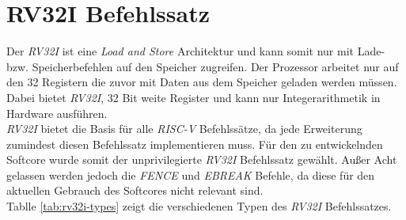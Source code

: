     \section{RV32I Befehlssatz}
        Der \textit{RV32I} ist eine \textit{Load and Store} Architektur und kann somit nur mit
        Lade- bzw. Speicherbefehlen auf den Speicher zugreifen.
        Der Prozessor arbeitet nur auf den 32 Registern die zuvor mit Daten aus dem Speicher geladen werden müssen.
        Dabei bietet \textit{RV32I}, 32 Bit weite Register und kann nur Integerarithmetik in Hardware ausführen.
        \\
        \textit{RV32I} bietet die Basis für alle \textit{RISC-V} Befehlssätze,
        da jede Erweiterung zumindest diesen Befehlssatz implementieren muss.
        Für den zu entwickelnden Softcore wurde somit der unprivilegierte \textit{RV32I} Befehlssatz gewählt.
        Außer Acht gelassen werden jedoch die \textit{FENCE} und \textit{EBREAK} Befehle, da diese für
        den aktuellen Gebrauch des Softcores nicht relevant sind.
        \\
        Tablle \ref{tab:rv32i-types} zeigt die verschiedenen Typen des \textit{RV32I} Befehlssatzes.
        

